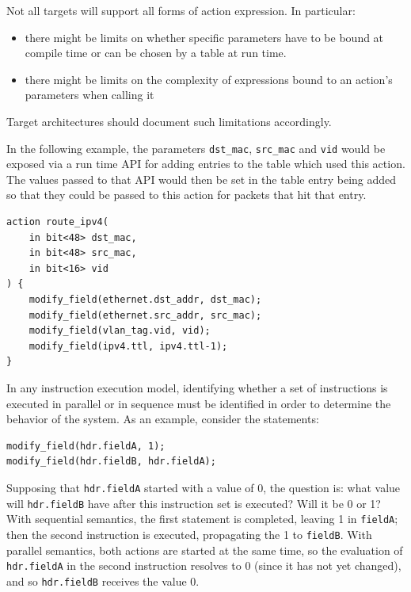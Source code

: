 \documentclass[12pt]{article}
\begin{document}
Not all targets will support all forms of action expression. In particular:
\begin{itemize}
\item
there might be limits on whether specific parameters have to be bound at
compile time or can be chosen by a table at run time.
\item
there might be limits on the complexity of expressions bound to an action's
parameters when calling it
\end{itemize}
Target architectures should document such limitations accordingly.

In the following example, the parameters \texttt{dst_mac}, \texttt{src_mac} 
and \texttt{vid} would be exposed via a run time API for adding entries to the 
table which used this action. The values passed to that API would then be set 
in the table entry being added so that they could be passed to this action for 
packets that hit that entry.

\begin{lstlisting}[style=P4style]
action route_ipv4(
    in bit<48> dst_mac,
    in bit<48> src_mac,
    in bit<16> vid
) {
    modify_field(ethernet.dst_addr, dst_mac);
    modify_field(ethernet.src_addr, src_mac);
    modify_field(vlan_tag.vid, vid);
    modify_field(ipv4.ttl, ipv4.ttl-1);
}
\end{lstlisting}


In any instruction execution model, identifying whether a set of instructions 
is executed in parallel or in sequence must be identified in order to determine 
the behavior of the system. As an example, consider the statements:

\begin{lstlisting}[style=P4style]
modify_field(hdr.fieldA, 1);
modify_field(hdr.fieldB, hdr.fieldA);
\end{lstlisting}


Supposing that \texttt{hdr.fieldA} started with a value of 0, the question is: what 
value will \texttt{hdr.fieldB} have after this instruction set is executed? Will 
it be 0 or 1? With sequential semantics, the first statement is completed, 
leaving 1 in \texttt{fieldA}; then the second instruction is executed, propagating 
the 1 to \texttt{fieldB}.  With parallel semantics, both actions are started at the 
same time, so the evaluation of \texttt{hdr.fieldA} in the second instruction resolves 
to 0 (since it has not yet changed), and so \texttt{hdr.fieldB} receives the value 
0.
\end{document}

